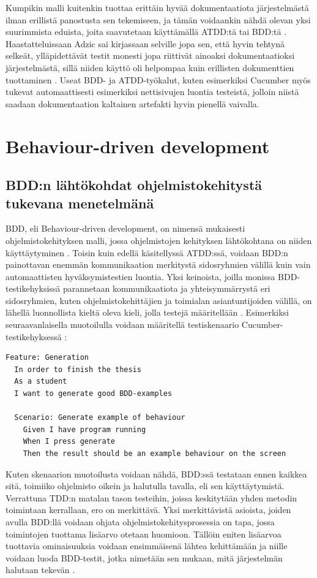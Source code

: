 \documentclass[finnish,nonumbib,nocopyright]{gradu2}
\begin{document}
Kumpikin malli kuitenkin tuottaa erittäin hyvää dokumentaatiota järjestelmästä ilman erillistä panostusta sen tekemiseen, ja tämän voidaankin nähdä olevan yksi suurimmista eduista, joita saavutetaan käyttämällä ATDD:tä tai BDD:tä \cite{specification}. Haastatteluissaan Adzic sai kirjassaan selville jopa sen, että hyvin tehtynä selkeät, ylläpidettävät testit monesti jopa riittivät ainoaksi dokumentaatioksi järjestelmästä, sillä niiden käyttö oli helpompaa kuin erillisten dokumenttien tuottaminen \cite{specification}. Useat BDD- ja ATDD-työkalut, kuten esimerkiksi Cucumber \cite{cucumber} myös tukevat automaattisesti esimerkiksi nettisivujen luontia testeistä, jolloin niistä saadaan dokumentaation kaltainen artefakti hyvin pienellä vaivalla.

\chapter{Behaviour-driven development}

\section{BDD:n lähtökohdat ohjelmistokehitystä tukevana menetelmänä}
BDD, eli Behaviour-driven development, on nimensä mukaisesti ohjelmistokehityksen malli, jossa ohjelmistojen kehityksen lähtökohtana on niiden käyttäytyminen \cite{bddintro}. Toisin kuin edellä käsitellyssä ATDD:ssä, voidaan BDD:n painottavan enemmän kommunikaation merkitystä sidosryhmien välillä kuin vain automaattisten hyväksymistestien luontia. Yksi keinoista, joilla monissa BDD-testikehyksissä parannetaan kommunikaatiota ja yhteisymmärrystä eri sidosryhmien, kuten ohjelmistokehittäjien ja toimialan asiantuntijoiden välillä, on lähellä luonnollista kieltä oleva kieli, jolla testejä määritellään \cite{cucumberbook}. Esimerkiksi seuraavanlaisella muotoilulla voidaan määritellä testiskenaario Cucumber-testikehyksessä \cite{cucumber}:

\begin{verbatim}
Feature: Generation
  In order to finish the thesis
  As a student
  I want to generate good BDD-examples

  Scenario: Generate example of behaviour
    Given I have program running
    When I press generate
    Then the result should be an example behaviour on the screen
\end{verbatim} 

Kuten skenaarion muotoilusta voidaan nähdä, BDD:ssä testataan ennen kaikkea sitä, toimiiko ohjelmisto oikein ja halutulla tavalla, eli sen käyttäytymistä. Verrattuna TDD:n matalan tason testeihin, joissa keskitytään yhden metodin toimintaan kerrallaan, ero on merkittävä. Yksi merkittävistä asioista, joiden avulla BDD:llä voidaan ohjata ohjelmistokehitysprosessia on tapa, jossa toimintojen tuottama lisäarvo otetaan huomioon. Tällöin eniten lisäarvoa tuottavia ominaisuuksia voidaan ensimmäisenä lähtea kehittämään ja niille voidaan luoda BDD-testit, jotka nimetään sen mukaan, mitä järjestelmän halutaan tekevän \cite{bddintro}.
\end{document}
